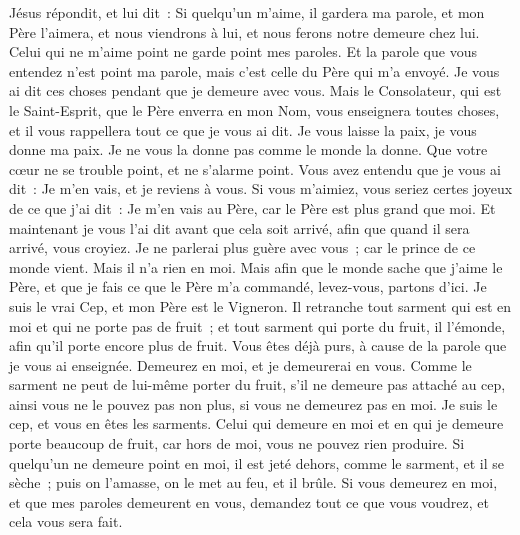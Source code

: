 \begin{multicols}{2}
Jésus répondit, et lui dit~: Si quelqu'un m'aime, il gardera ma parole, et mon Père l'aimera, et nous viendrons à lui, et nous ferons notre demeure chez lui.
Celui qui ne m'aime point ne garde point mes paroles. Et la parole que vous entendez n'est point ma parole, mais c'est celle du Père qui m'a envoyé.
Je vous ai dit ces choses pendant que je demeure avec vous.
Mais le Consolateur, qui est le Saint-Esprit, que le Père enverra en mon Nom, vous enseignera toutes choses, et il vous rappellera tout ce que je vous ai dit.
Je vous laisse la paix, je vous donne ma paix. Je ne vous la donne pas comme le monde la donne. Que votre cœur ne se trouble point, et ne s'alarme point.
Vous avez entendu que je vous ai dit~: Je m'en vais, et je reviens à vous. Si vous m'aimiez, vous seriez certes joyeux de ce que j'ai dit~: Je m'en vais au Père, car le Père est plus grand que moi.
Et maintenant je vous l'ai dit avant que cela soit arrivé, afin que quand il sera arrivé, vous croyiez.
Je ne parlerai plus guère avec vous~; car le prince de ce monde vient. Mais il n'a rien en moi.
Mais afin que le monde sache que j'aime le Père, et que je fais ce que le Père m'a commandé, levez-vous, partons d'ici.
\VerseOne{}Je suis le vrai Cep, et mon Père est le Vigneron.
Il retranche tout sarment qui est en moi et qui ne porte pas de fruit~; et tout sarment qui porte du fruit, il l'émonde, afin qu'il porte encore plus de fruit.
Vous êtes déjà purs, à cause de la parole que je vous ai enseignée.
Demeurez en moi, et je demeurerai en vous. Comme le sarment ne peut de lui-même porter du fruit, s'il ne demeure pas attaché au cep, ainsi vous ne le pouvez pas non plus, si vous ne demeurez pas en moi.
Je suis le cep, et vous en êtes les sarments. Celui qui demeure en moi et en qui je demeure porte beaucoup de fruit, car hors de moi, vous ne pouvez rien produire.
Si quelqu'un ne demeure point en moi, il est jeté dehors, comme le sarment, et il se sèche~; puis on l'amasse, on le met au feu, et il brûle.
Si vous demeurez en moi, et que mes paroles demeurent en vous, demandez tout ce que vous voudrez, et cela vous sera fait.

\end{multicols}
